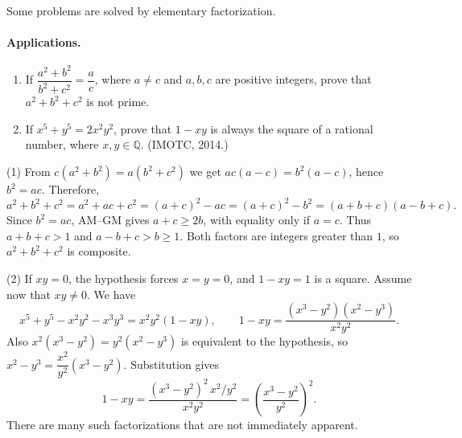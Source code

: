 \documentclass[11pt,a4paper]{article}
\begin{document}
\setcounter{theorem}{20}\begin{lemma}[Factorization]
Some problems are solved by elementary factorization.
\end{lemma}
\paragraph{Applications.}
\begin{enumerate}
\setcounter{enumi}{0}\item If $\dfrac{a^2+b^2}{b^2+c^2}=\dfrac ac$, where $a\ne c$ and $a,b,c$ are positive integers,
 prove that $a^2+b^2+c^2$ is not prime.
\setcounter{enumi}{1}\item If $x^5+y^5=2x^2y^2$, prove that $1-xy$ is always the square of a rational number,
where $x,y\in\mathbb Q$. (IMOTC, 2014.)
\end{enumerate}
(1) From $c(a^2+b^2)=a(b^2+c^2)$ we get $ac(a-c)=b^2(a-c)$, hence $b^2=ac$.
Therefore,
\[
a^2+b^2+c^2=a^2+ac+c^2=(a+c)^2-ac=(a+c)^2-b^2=(a+b+c)(a-b+c).
\]
Since $b^2=ac$, AM--GM gives $a+c\geq2b$, with equality only if $a=c$.
Thus $a+b+c>1$ and $a-b+c>b\geq1$. Both factors are integers greater than
$1$, so $a^2+b^2+c^2$ is composite.

(2) If $xy=0$, the hypothesis forces $x=y=0$, and $1-xy=1$ is a square.
Assume now that $xy\ne0$. We have
\[
x^5+y^5-x^2y^2-x^3y^3=x^2y^2(1-xy),\qquad
1-xy=\frac{(x^3-y^2)(x^2-y^3)}{x^2y^2}.
\]
Also $x^2(x^3-y^2)=y^2(x^2-y^3)$ is equivalent to the hypothesis, so
$x^2-y^3=\dfrac{x^2}{y^2}(x^3-y^2)$. Substitution gives
\[
1-xy=\frac{(x^3-y^2)^2\,x^2/y^2}{x^2y^2}
=\left(\frac{x^3-y^2}{y^2}\right)^2.
\]
There are many such factorizations that are not immediately apparent.
\end{document}
